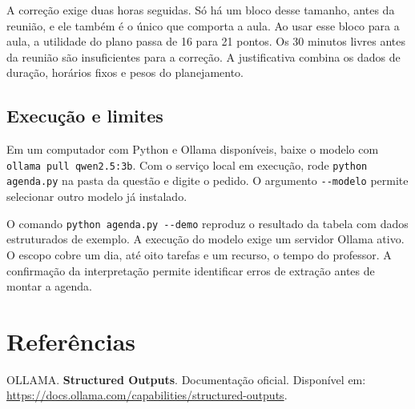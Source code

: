 \documentclass[12pt,a4paper]{article}
\begin{document}
A correção exige duas horas seguidas. Só há um bloco desse tamanho, antes da reunião, e ele também é o único que comporta a aula. Ao usar esse bloco para a aula, a utilidade do plano passa de 16 para 21 pontos. Os 30 minutos livres antes da reunião são insuficientes para a correção. A justificativa combina os dados de duração, horários fixos e pesos do planejamento.

\subsection{Execução e limites}

Em um computador com Python e Ollama disponíveis, baixe o modelo com \texttt{ollama pull qwen2.5:3b}. Com o serviço local em execução, rode \texttt{python agenda.py} na pasta da questão e digite o pedido. O argumento \texttt{-{}-modelo} permite selecionar outro modelo já instalado.

O comando \texttt{python agenda.py -{}-demo} reproduz o resultado da tabela com dados estruturados de exemplo. A execução do modelo exige um servidor Ollama ativo. O escopo cobre um dia, até oito tarefas e um recurso, o tempo do professor. A confirmação da interpretação permite identificar erros de extração antes de montar a agenda.

\section*{Referências}

\noindent [1] OLLAMA. \textbf{Structured Outputs}. Documentação oficial. Disponível em: \url{https://docs.ollama.com/capabilities/structured-outputs}.
\end{document}
